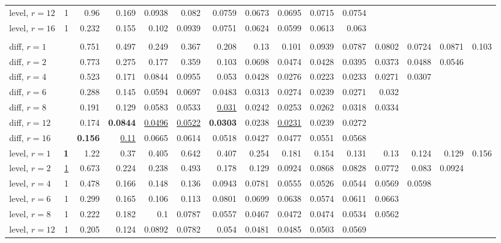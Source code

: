 \begin{table}[t]
\begin{tabular}{lrrrrrrrrrrrrrr}
\quad level, $r{=}12$ & 1 & 0.96 & 0.169 & 0.0938 & 0.082 & 0.0759 & 0.0673 & 0.0695 & 0.0715 & 0.0754 &  &  &  &  \\
\quad level, $r{=}16$ & 1 & 0.232 & 0.155 & 0.102 & 0.0939 & 0.0751 & 0.0624 & 0.0599 & 0.0613 & 0.063 &  &  &  &  \\
\addlinespace
\multicolumn{15}{l}{\textit{Chronos-2 L}} \\
\quad diff, $r{=}1$ &  & 0.751 & 0.497 & 0.249 & 0.367 & 0.208 & 0.13 & 0.101 & 0.0939 & 0.0787 & 0.0802 & 0.0724 & 0.0871 & 0.103 \\
\quad diff, $r{=}2$ &  & 0.773 & 0.275 & 0.177 & 0.359 & 0.103 & 0.0698 & 0.0474 & 0.0428 & 0.0395 & 0.0373 & 0.0488 & 0.0546 &  \\
\quad diff, $r{=}4$ &  & 0.523 & 0.171 & 0.0844 & 0.0955 & 0.053 & 0.0428 & 0.0276 & 0.0223 & 0.0233 & 0.0271 & 0.0307 &  &  \\
\quad diff, $r{=}6$ &  & 0.288 & 0.145 & 0.0594 & 0.0697 & 0.0483 & 0.0313 & 0.0274 & 0.0239 & 0.0271 & 0.032 &  &  &  \\
\quad diff, $r{=}8$ &  & 0.191 & 0.129 & 0.0583 & 0.0533 & \underline{0.031} & 0.0242 & 0.0253 & 0.0262 & 0.0318 & 0.0334 &  &  &  \\
\quad diff, $r{=}12$ &  & 0.174 & \textbf{0.0844} & \underline{0.0496} & \underline{0.0522} & \textbf{0.0303} & 0.0238 & \underline{0.0231} & 0.0239 & 0.0272 &  &  &  &  \\
\quad diff, $r{=}16$ &  & \textbf{0.156} & \underline{0.11} & 0.0665 & 0.0614 & 0.0518 & 0.0427 & 0.0477 & 0.0551 & 0.0568 &  &  &  &  \\
\quad level, $r{=}1$ & \textbf{1} & 1.22 & 0.37 & 0.405 & 0.642 & 0.407 & 0.254 & 0.181 & 0.154 & 0.131 & 0.13 & 0.124 & 0.129 & 0.156 \\
\quad level, $r{=}2$ & \underline{1} & 0.673 & 0.224 & 0.238 & 0.493 & 0.178 & 0.129 & 0.0924 & 0.0868 & 0.0828 & 0.0772 & 0.083 & 0.0924 &  \\
\quad level, $r{=}4$ & 1 & 0.478 & 0.166 & 0.148 & 0.136 & 0.0943 & 0.0781 & 0.0555 & 0.0526 & 0.0544 & 0.0569 & 0.0598 &  &  \\
\quad level, $r{=}6$ & 1 & 0.299 & 0.165 & 0.106 & 0.113 & 0.0801 & 0.0699 & 0.0638 & 0.0574 & 0.0611 & 0.0663 &  &  &  \\
\quad level, $r{=}8$ & 1 & 0.222 & 0.182 & 0.1 & 0.0787 & 0.0557 & 0.0467 & 0.0472 & 0.0474 & 0.0534 & 0.0562 &  &  &  \\
\quad level, $r{=}12$ & 1 & 0.205 & 0.124 & 0.0892 & 0.0782 & 0.054 & 0.0481 & 0.0485 & 0.0503 & 0.0569 &  &  &  &  \\

\end{tabular}
\end{table}
